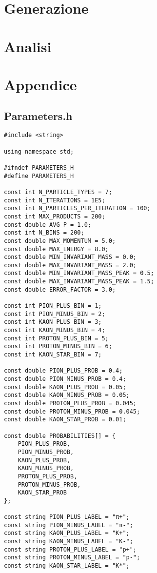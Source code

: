 \documentclass{article}
\begin{document}
\section{Generazione}


\section{Analisi}

\section*{Appendice}
\subsection*{Parameters.h}
\begin{verbatim}
#include <string>

using namespace std;

#ifndef PARAMETERS_H
#define PARAMETERS_H

const int N_PARTICLE_TYPES = 7;
const int N_ITERATIONS = 1E5;
const int N_PARTICLES_PER_ITERATION = 100;
const int MAX_PRODUCTS = 200;
const double AVG_P = 1.0;
const int N_BINS = 200;
const double MAX_MOMENTUM = 5.0;
const double MAX_ENERGY = 8.0;
const double MIN_INVARIANT_MASS = 0.0;
const double MAX_INVARIANT_MASS = 2.0;
const double MIN_INVARIANT_MASS_PEAK = 0.5;
const double MAX_INVARIANT_MASS_PEAK = 1.5;
const double ERROR_FACTOR = 3.0;

const int PION_PLUS_BIN = 1;
const int PION_MINUS_BIN = 2;
const int KAON_PLUS_BIN = 3;
const int KAON_MINUS_BIN = 4;
const int PROTON_PLUS_BIN = 5;
const int PROTON_MINUS_BIN = 6;
const int KAON_STAR_BIN = 7;

const double PION_PLUS_PROB = 0.4;
const double PION_MINUS_PROB = 0.4;
const double KAON_PLUS_PROB = 0.05;
const double KAON_MINUS_PROB = 0.05;
const double PROTON_PLUS_PROB = 0.045;
const double PROTON_MINUS_PROB = 0.045;
const double KAON_STAR_PROB = 0.01;

const double PROBABILITIES[] = {
    PION_PLUS_PROB,
    PION_MINUS_PROB,
    KAON_PLUS_PROB,
    KAON_MINUS_PROB,
    PROTON_PLUS_PROB,
    PROTON_MINUS_PROB,
    KAON_STAR_PROB
};

const string PION_PLUS_LABEL = "π+";
const string PION_MINUS_LABEL = "π-";
const string KAON_PLUS_LABEL = "K+";
const string KAON_MINUS_LABEL = "K-";
const string PROTON_PLUS_LABEL = "p+";
const string PROTON_MINUS_LABEL = "p-";
const string KAON_STAR_LABEL = "K*";


\end{verbatim}
\end{document}
